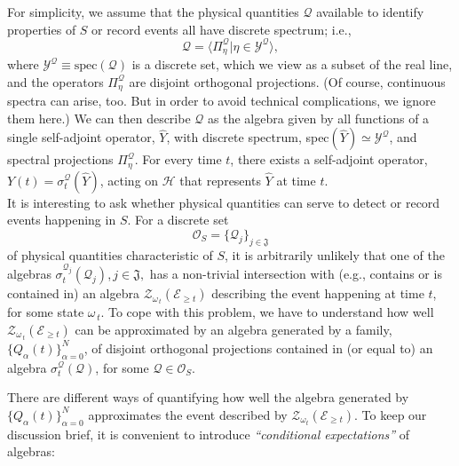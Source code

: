 \documentclass[a4paper,11pt]{article}
\begin{document}
\begin{enumerate}
{For simplicity, we assume that the physical quantities $\mathcal{Q}$ available to identify properties of $S$ or record events all have discrete spectrum; i.e., 
\begin{equation}\label{phys-Q}
\mathcal{Q} = \langle \Pi_{\eta}^{\mathcal{Q}} \vert \eta \in \mathcal{Y}^{\mathcal{Q}} \rangle,
\end{equation}
where $\mathcal{Y}^{\mathcal{Q}} \equiv \text{spec}(\mathcal{Q})$ is a discrete set, which we view as a subset of the real line, and the operators $\Pi_{\eta}^{\mathcal{Q}}$ are disjoint orthogonal projections. (Of course, continuous spectra can arise, too. But in order to avoid technical complications, we ignore them here.)
We can then describe $\mathcal{Q}$ as the algebra given by all functions of a single self-adjoint operator, $\widehat{Y}$, with
discrete spectrum, spec$(\widehat{Y}) \simeq \mathcal{Y}^{\mathcal{Q}}$, and spectral projections $\Pi_{\eta}^{\mathcal{Q}}$. For every time $t$, there exists a self-adjoint operator,
$Y(t)=\sigma_{t}^{\mathcal{Q}}(\widehat{Y})$, acting on $\mathcal{H}$  that represents $\widehat{Y}$ at time $t$. \\
It is interesting to ask whether physical quantities can serve to detect or record events happening in $S$. For a discrete set
$$\mathcal{O}_{S}= \lbrace \mathcal{Q}_j \rbrace_{j \in \mathfrak{J}}$$
 of physical quantities characteristic of $S$, it is arbitrarily unlikely that one of the algebras $\sigma_{t}^{\mathcal{Q_{\textit{j}}}}(\mathcal{Q}_{j} )$,\,$j\in \mathfrak{J},$ has a non-trivial intersection with (e.g., contains or is contained in) an algebra 
 $\mathcal{Z}_{\omega_{\,t}}(\mathcal{E}_{\geq t})$ describing the event happening at time $t$, for some state $\omega_{\,t}$. To cope with this problem, we have to understand how well $\mathcal{Z}_{\omega_{\,t}}(\mathcal{E}_{\geq t})$ can be approximated by an algebra generated by a family, $\lbrace Q_{\alpha}(t) \rbrace_{\alpha=0}^{N}$, of disjoint orthogonal projections  contained in (or equal to) an algebra $\sigma_{t}^{\mathcal{Q}}(\mathcal{Q})$, for some $\mathcal{Q} \in \mathcal{O}_{S}$.
 
  There are different ways of quantifying how well the algebra generated by $\lbrace Q_{\alpha}(t) \rbrace_{\alpha=0}^{N}$ approximates the event described by $\mathcal{Z}_{\omega_t}(\mathcal{E}_{\geq t})$. To keep our discussion brief, it is 
 convenient to introduce \textit{``conditional expectations''} of algebras:\\
 
}
\end{enumerate}
\end{document}

